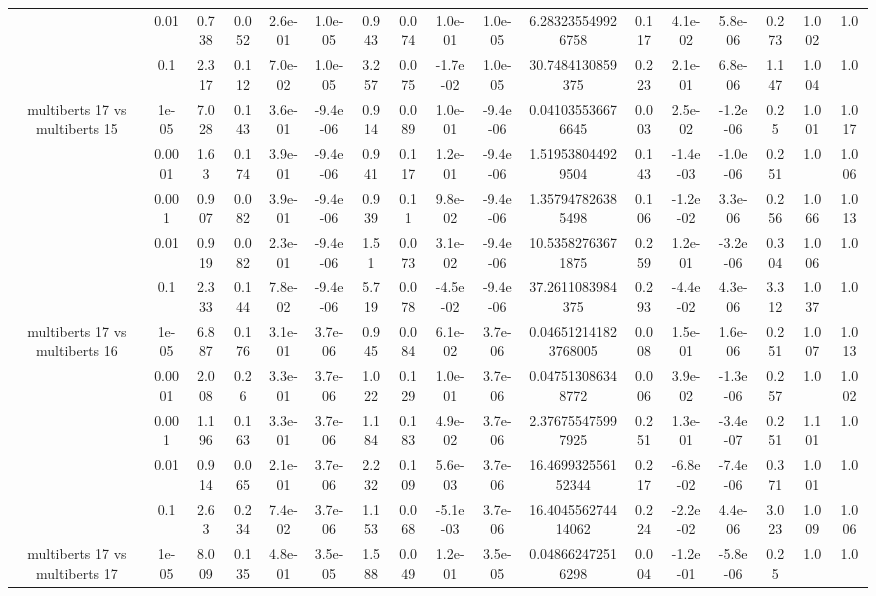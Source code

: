 \begin{tabular}{|c|c|c|c|c|c|c|c|c|c|c|c|c|c|c|c|c|}
 & 0.01 & 0.738 & 0.052 & 2.6e-01 & 1.0e-05 & 0.943 & 0.074 & 1.0e-01 & 1.0e-05 & 6.283235549926758 & 0.117 & 4.1e-02 & 5.8e-06 & 0.273 & 1.002 & 1.0 \\
 & 0.1 & 2.317 & 0.112 & 7.0e-02 & 1.0e-05 & 3.257 & 0.075 & -1.7e-02 & 1.0e-05 & 30.7484130859375 & 0.223 & 2.1e-01 & 6.8e-06 & 1.147 & 1.004 & 1.0 \\
\hline
\multirow{5}{*}{multiberts 17 vs multiberts 15} & 1e-05 & 7.028 & 0.143 & 3.6e-01 & -9.4e-06 & 0.914 & 0.089 & 1.0e-01 & -9.4e-06 & 0.041035536676645 & 0.003 & 2.5e-02 & -1.2e-06 & 0.25 & 1.001 & 1.017 \\
 & 0.0001 & 1.63 & 0.174 & 3.9e-01 & -9.4e-06 & 0.941 & 0.117 & 1.2e-01 & -9.4e-06 & 1.519538044929504 & 0.143 & -1.4e-03 & -1.0e-06 & 0.251 & 1.0 & 1.006 \\
 & 0.001 & 0.907 & 0.082 & 3.9e-01 & -9.4e-06 & 0.939 & 0.11 & 9.8e-02 & -9.4e-06 & 1.357947826385498 & 0.106 & -1.2e-02 & 3.3e-06 & 0.256 & 1.066 & 1.013 \\
 & 0.01 & 0.919 & 0.082 & 2.3e-01 & -9.4e-06 & 1.51 & 0.073 & 3.1e-02 & -9.4e-06 & 10.53582763671875 & 0.259 & 1.2e-01 & -3.2e-06 & 0.304 & 1.006 & 1.0 \\
 & 0.1 & 2.333 & 0.144 & 7.8e-02 & -9.4e-06 & 5.719 & 0.078 & -4.5e-02 & -9.4e-06 & 37.2611083984375 & 0.293 & -4.4e-02 & 4.3e-06 & 3.312 & 1.037 & 1.0 \\
\hline
\multirow{5}{*}{multiberts 17 vs multiberts 16} & 1e-05 & 6.887 & 0.176 & 3.1e-01 & 3.7e-06 & 0.945 & 0.084 & 6.1e-02 & 3.7e-06 & 0.046512141823768005 & 0.008 & 1.5e-01 & 1.6e-06 & 0.251 & 1.007 & 1.013 \\
 & 0.0001 & 2.008 & 0.26 & 3.3e-01 & 3.7e-06 & 1.022 & 0.129 & 1.0e-01 & 3.7e-06 & 0.047513086348772 & 0.006 & 3.9e-02 & -1.3e-06 & 0.257 & 1.0 & 1.002 \\
 & 0.001 & 1.196 & 0.163 & 3.3e-01 & 3.7e-06 & 1.184 & 0.183 & 4.9e-02 & 3.7e-06 & 2.376755475997925 & 0.251 & 1.3e-01 & -3.4e-07 & 0.251 & 1.101 & 1.0 \\
 & 0.01 & 0.914 & 0.065 & 2.1e-01 & 3.7e-06 & 2.232 & 0.109 & 5.6e-03 & 3.7e-06 & 16.469932556152344 & 0.217 & -6.8e-02 & -7.4e-06 & 0.371 & 1.001 & 1.0 \\
 & 0.1 & 2.63 & 0.234 & 7.4e-02 & 3.7e-06 & 1.153 & 0.068 & -5.1e-03 & 3.7e-06 & 16.404556274414062 & 0.224 & -2.2e-02 & 4.4e-06 & 3.023 & 1.009 & 1.006 \\
\hline
\multirow{5}{*}{multiberts 17 vs multiberts 17} & 1e-05 & 8.009 & 0.135 & 4.8e-01 & 3.5e-05 & 1.588 & 0.049 & 1.2e-01 & 3.5e-05 & 0.048662472516298 & 0.004 & -1.2e-01 & -5.8e-06 & 0.25 & 1.0 & 1.0 \\

\end{tabular}
